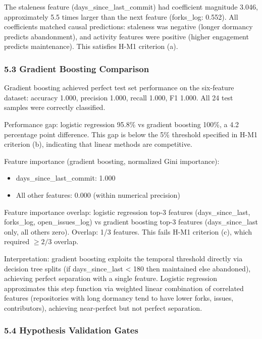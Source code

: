 The staleness feature (days\_since\_last\_commit) had coefficient magnitude 3.046, approximately 5.5 times larger than the next feature (forks\_log: 0.552). All coefficients matched causal predictions: staleness was negative (longer dormancy predicts abandonment), and activity features were positive (higher engagement predicts maintenance). This satisfies H-M1 criterion (a).

\subsubsection{5.3 Gradient Boosting Comparison}

Gradient boosting achieved perfect test set performance on the six-feature dataset: accuracy 1.000, precision 1.000, recall 1.000, F1 1.000. All 24 test samples were correctly classified.

Performance gap: logistic regression 95.8\% vs gradient boosting 100\%, a 4.2 percentage point difference. This gap is below the 5\% threshold specified in H-M1 criterion (b), indicating that linear methods are competitive.

Feature importance (gradient boosting, normalized Gini importance):
\begin{itemize}
\item days\_since\_last\_commit: 1.000
\item All other features: 0.000 (within numerical precision)
\end{itemize}

Feature importance overlap: logistic regression top-3 features (days\_since\_last, forks\_log, open\_issues\_log) vs gradient boosting top-3 features (days\_since\_last only, all others zero). Overlap: 1/3 features. This fails H-M1 criterion (c), which required $\geq 2/3$ overlap.

Interpretation: gradient boosting exploits the temporal threshold directly via decision tree splits (if days\_since\_last < 180 then maintained else abandoned), achieving perfect separation with a single feature. Logistic regression approximates this step function via weighted linear combination of correlated features (repositories with long dormancy tend to have lower forks, issues, contributors), achieving near-perfect but not perfect separation.

\subsubsection{5.4 Hypothesis Validation Gates}

